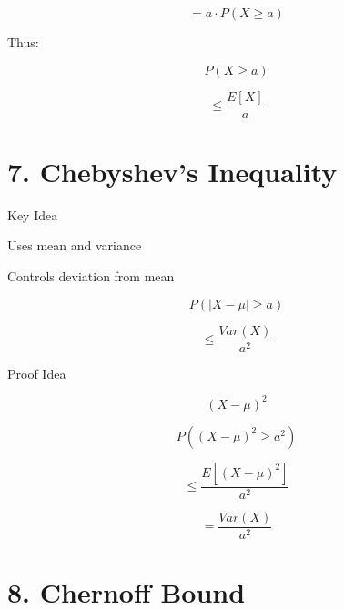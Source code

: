 \documentclass[12pt]{article}
\begin{document}
\[
= a \cdot P(X \geq a)
\]

\vspace{1em}

Thus:

\vspace{0.5em}

\[
P(X \geq a)
\]

\vspace{0.5em}

\[
\leq \frac{E[X]}{a}
\]

\vspace{2em}

\section*{7. Chebyshev’s Inequality}

\vspace{0.5em}

Key Idea

Uses mean and variance

Controls deviation from mean

\vspace{1em}

\[
P(|X - \mu| \geq a)
\]

\vspace{0.5em}

\[
\leq \frac{Var(X)}{a^2}
\]

\vspace{1em}

Proof Idea

\vspace{0.5em}

\[
(X - \mu)^2
\]

\vspace{0.5em}

\[
P((X - \mu)^2 \geq a^2)
\]

\vspace{0.5em}

\[
\leq \frac{E[(X - \mu)^2]}{a^2}
\]

\vspace{0.5em}

\[
= \frac{Var(X)}{a^2}
\]

\vspace{2em}

\section*{8. Chernoff Bound}

\vspace{0.5em}
\end{document}
